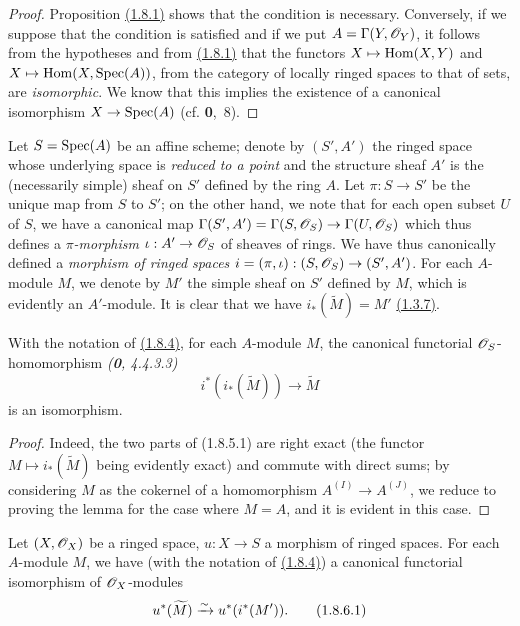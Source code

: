 \begin{proof}
\label{proof-cor-1.1.8.3}
Proposition \hyperref[prop-1.1.8.1]{(1.8.1)} shows that the condition is necessary. Conversely, if we
suppose that the condition is satisfied and if we put $A=\Gamma(Y,\mathscr{O}_Y)$, it follows from
the hypotheses and from \hyperref[prop-1.1.8.1]{(1.8.1)} that the functors $X\mapsto{\mathop{\mathrm{Hom}}\nolimits}(X,Y)$ and
$X\mapsto{\mathop{\mathrm{Hom}}\nolimits}(X,{\mathop{\mathrm{Spec}}\nolimits}(A))$, from the category of locally ringed spaces to that of sets, are
{\it isomorphic}. We know that this implies the existence of a canonical isomorphism
$X\to{\mathop{\mathrm{Spec}}\nolimits}(A)$ (cf. \textbf{0},~8).
\end{proof}

\begin{env}[1.8.4]
\label{env-1.1.8.4}
Let $S={\mathop{\mathrm{Spec}}\nolimits}(A)$ be an affine scheme; denote by $(S',A')$ the ringed space whose underlying
space is {\it reduced to a point} and the structure sheaf $A'$ is the (necessarily simple)
sheaf on $S'$ defined by the ring $A$. Let $\pi:S\to S'$ be the unique map from $S$ to $S'$;
on the other hand, we note that for each open subset $U$ of $S$, we have a canonical map
$\Gamma(S',A')=\Gamma(S,\mathscr{O}_S)\to\Gamma(U,\mathscr{O}_S)$ which thus defines a {\it $\pi$-morphism}
$\iota:A'\to\mathscr{O}_S$ of sheaves of rings. We have thus canonically defined a {\it morphism of
ringed spaces $i=(\pi,\iota):(S,\mathscr{O}_S)\to(S',A')$}. For each $A$-module $M$, we denote by
$M'$ the simple sheaf on $S'$ defined by $M$, which is evidently an $A'$-module. It is clear
that we have $i_*(\widetilde{M})=M'$ \hyperref[thm-1.1.3.7]{(1.3.7)}.
\end{env}

\begin{lem}[1.8.5]
\label{lem-1.1.8.5}
With the notation of \hyperref[env-1.1.8.4]{(1.8.4)}, for each $A$-module $M$, the canonical functorial
$\mathscr{O}_S$-homomorphism {\it (\textbf{0}, 4.4.3.3)}
\[
  i^*(i_*(\widetilde{M}))\longrightarrow\widetilde{M}
  \tag{1.8.5.1}
\]
is an isomorphism.
\end{lem}

\begin{proof}
\label{proof-lem-1.1.8.5}
Indeed, the two parts of (1.8.5.1) are right exact (the functor
$M\mapsto i_*(\widetilde{M})$ being evidently exact) and commute with direct sums; by
considering $M$ as the cokernel of a homomorphism $A^{(I)}\to A^{(J)}$, we reduce to proving
the lemma for the case where $M=A$, and it is evident in this case.
\end{proof}

\begin{cor}[1.8.6]
\label{cor-1.1.8.6}
Let $(X,\mathscr{O}_X)$ be a ringed space, $u:X\to S$ a morphism of ringed spaces.
For each $A$-module $M$, we have (with the notation of \hyperref[env-1.1.8.4]{(1.8.4)}) a canonical
functorial isomorphism of $\mathscr{O}_X$-modules
\[
  u^*(\widetilde{M})\xrightarrow{\sim} u^*(i^*(M')).
  \tag{1.8.6.1}
\]
\end{cor}

